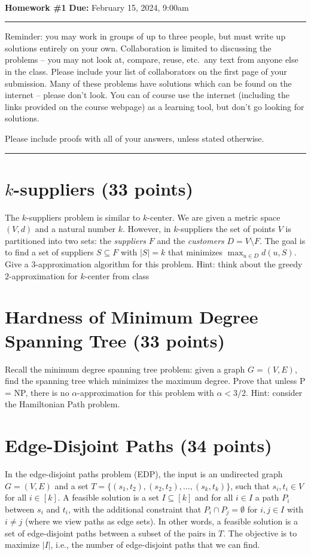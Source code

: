 \documentclass[11pt]{article}
\begin{document}
\\
{{\bf Homework \#1}} \hfill {{\bf Due:} February 15, 2024, 9:00am} \\
\rule[0.1in]{\textwidth}{0.4pt}

Reminder: you may work in groups of up to three people, but must write up solutions entirely on your own.  Collaboration is limited to discussing the problems -- you may not look at, compare, reuse, etc.~any text from anyone else in the class.  Please include your list of collaborators on the first page of your submission.  Many of these problems have solutions which can be found on the internet -- please don't look.  You can of course use the internet (including the links provided on the course webpage) as a learning tool, but don't go looking for solutions.  

Please include proofs with all of your answers, unless stated otherwise.

\noindent \rule[0.1in]{\textwidth}{0.4pt}

\section{$k$-suppliers (33 points)}

The $k$-suppliers problem is similar to $k$-center.  We are given a metric space $(V,d)$ and a natural number $k$.  However,  in $k$-suppliers the set of points $V$ is partitioned into two sets: the \emph{suppliers} $F$ and the \emph{customers} $D = V \setminus F$.  The goal is to find a set of suppliers $S \subseteq F$ with $|S| = k$ that minimizes $\max_{u \in D} d(u,S)$.  Give a $3$-approximation algorithm for this problem.  Hint: think about the greedy $2$-approximation for $k$-center  from class  


\section{Hardness of Minimum Degree Spanning Tree (33 points)}
Recall the minimum degree spanning tree problem: given a graph $G = (V,E)$, find the spanning tree which minimizes the maximum degree.  Prove that unless P = NP, there is no $\alpha$-approximation for this problem with $\alpha < 3/2$.   Hint: consider the Hamiltonian Path problem.


\section{Edge-Disjoint Paths (34 points)}
In the edge-disjoint paths problem (EDP), the input is an undirected graph $G = (V,E)$ and a set $T = \{(s_1, t_2), (s_2, t_2), \dots, (s_k, t_k)\}$, such that $s_i, t_i \in V$ for all $i \in [k]$.  A feasible solution is a set $I \subseteq [k]$ and for all $i \in I$ a path $P_i$ between $s_i$ and $t_i$, with the additional constraint that $P_i \cap P_j = \emptyset$ for $i, j \in I$ with $i \neq j$ (where we view paths as edge sets).  In other words, a feasible solution is a set of edge-disjoint paths between a subset of the pairs in $T$.  The objective is to maximize $|I|$, i.e., the number of edge-disjoint paths that we can find.  
\end{document}
